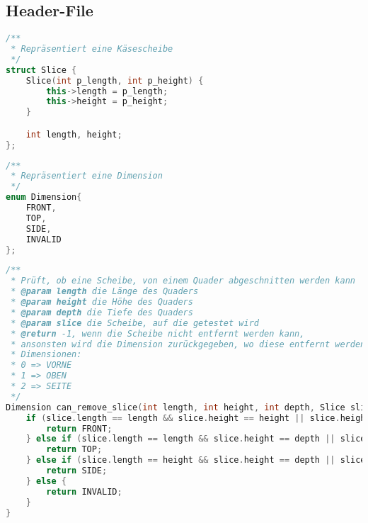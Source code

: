 \documentclass[a4paper,10pt,ngerman]{scrartcl}
\begin{document}
    \subsection{Header-File}\label{subsec:header-file}

    \begin{lstlisting}[frame=single,language=C++,title=Struct Slice,breaklines=true,label={lst:code_slice}]
/**
 * Repräsentiert eine Käsescheibe
 */
struct Slice {
    Slice(int p_length, int p_height) {
        this->length = p_length;
        this->height = p_height;
    }

    int length, height;
};
    \end{lstlisting}

    \begin{lstlisting}[frame=single,language=C++,title=Enum Dimension,breaklines=true,label={lst:code_dimension}]
/**
 * Repräsentiert eine Dimension
 */
enum Dimension{
    FRONT,
    TOP,
    SIDE,
    INVALID
};
    \end{lstlisting}

    \begin{lstlisting}[frame=single,language=C++,title=Methode can\_remove\_slice,breaklines=true,label={lst:code_canRemoveSlice}]
/**
 * Prüft, ob eine Scheibe, von einem Quader abgeschnitten werden kann
 * @param length die Länge des Quaders
 * @param height die Höhe des Quaders
 * @param depth die Tiefe des Quaders
 * @param slice die Scheibe, auf die getestet wird
 * @return -1, wenn die Scheibe nicht entfernt werden kann,
 * ansonsten wird die Dimension zurückgegeben, wo diese entfernt werden kann
 * Dimensionen:
 * 0 => VORNE
 * 1 => OBEN
 * 2 => SEITE
 */
Dimension can_remove_slice(int length, int height, int depth, Slice slice) {
    if (slice.length == length && slice.height == height || slice.height == length && slice.length == height) {
        return FRONT;
    } else if (slice.length == length && slice.height == depth || slice.height == length && slice.length == depth) {
        return TOP;
    } else if (slice.length == height && slice.height == depth || slice.height == height && slice.length == depth) {
        return SIDE;
    } else {
        return INVALID;
    }
}
    \end{lstlisting}

    \newpage
\end{document}
